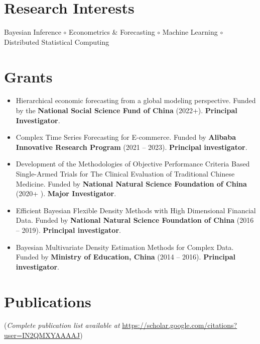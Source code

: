 \documentclass[twoside,a4paper]{article}
\begin{document}
\section{Research Interests}

Bayesian Inference $\circ$ Econometrics \& Forecasting $\circ$ Machine Learning $\circ$ Distributed Statistical Computing


\section{Grants}
\begin{itemize}
\item Hierarchical economic forecasting from a global modeling perspective. Funded by the \textbf{National Social Science Fund of China} (2022+). \textbf{Principal Investigator}.

\item Complex Time Series Forecasting for E-commerce. Funded by \textbf{Alibaba Innovative Research Program} (2021 -- 2023). \textbf{Principal investigator}.

\item Development of the Methodologies of Objective Performance Criteria Based Single-Armed Trials for The Clinical Evaluation of Traditional Chinese Medicine. Funded by \textbf{National Natural Science Foundation of China} (2020+  ). \textbf{Major Investigator}.

\item Efficient Bayesian Flexible Density Methods with High Dimensional Financial Data. Funded by \textbf{National Natural Science Foundation of China} (2016 -- 2019). \textbf{Principal investigator}.

\item Bayesian Multivariate Density Estimation Methods for Complex Data. Funded by \textbf{Ministry of Education, China} (2014 -- 2016). \textbf{Principal investigator}.

\end{itemize}

\section{Publications}

(\emph{Complete publication list available at}
  \url{https://scholar.google.com/citations?user=IN2QMXYAAAAJ})
\end{document}
